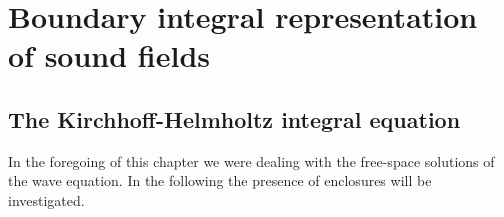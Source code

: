 %
%

\newpage
\section{Boundary integral representation of sound fields}

\subsection{The Kirchhoff-Helmholtz integral equation}
In the foregoing of this chapter we were dealing with the free-space solutions of the wave equation. In the following the presence of enclosures will be investigated.

